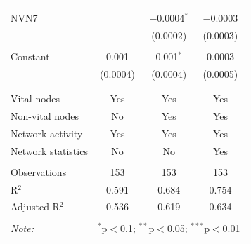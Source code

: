 \begin{table}[!htbp]
\begin{tabular}{@{\extracolsep{5pt}}lccc}
  & & & \\ 
 NVN7 &  & $-$0.0004$^{*}$ & $-$0.0003 \\ 
  &  & (0.0002) & (0.0003) \\ 
  & & & \\ 
 Constant & 0.001 & 0.001$^{*}$ & 0.0003 \\ 
  & (0.0004) & (0.0004) & (0.0005) \\ 
  & & & \\ 
\hline \\[-1.8ex] 
Vital nodes & Yes & Yes & Yes \\ 
Non-vital nodes & No & Yes & Yes \\ 
Network activity & Yes & Yes & Yes \\ 
Network statistics & No & No & Yes \\ 
\hline &  &  &  \\ 
Observations & 153 & 153 & 153 \\ 
R$^{2}$ & 0.591 & 0.684 & 0.754 \\ 
Adjusted R$^{2}$ & 0.536 & 0.619 & 0.634 \\ 
\hline 
\hline \\[-1.8ex] 
\textit{Note:}  & \multicolumn{3}{r}{$^{*}$p$<$0.1; $^{**}$p$<$0.05; $^{***}$p$<$0.01} \\ 
\end{tabular} 
\end{table} 
